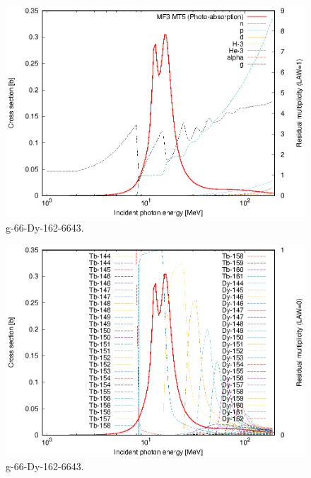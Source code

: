 \begin{figure}
 \includegraphics[width=\linewidth]{eps/g_66-Dy-162_6643.eps}
  \caption{g-66-Dy-162-6643.}
\end{figure}
\begin{figure}
 \includegraphics[width=\linewidth]{eps-law0/g_66-Dy-162_6643.eps}
 \caption{g-66-Dy-162-6643.}
\end{figure}
\newpage \clearpage

